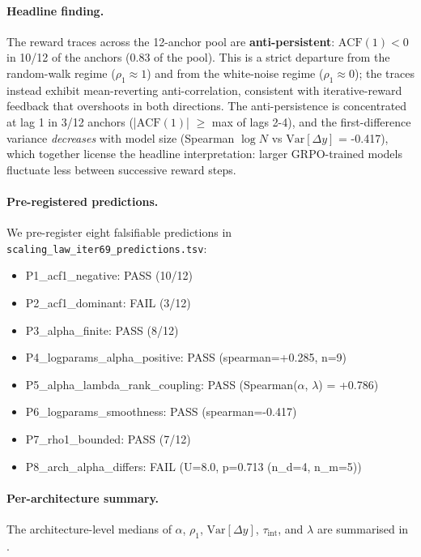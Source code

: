 \paragraph{Headline finding.}
The reward traces across the 12-anchor pool are
\textbf{anti-persistent}: $\mathrm{ACF}(1) < 0$ in
10/12 of the anchors (0.83 of the pool).
This is a strict departure from the random-walk regime
($\rho_1 \approx 1$) and from the white-noise regime
($\rho_1 \approx 0$); the traces instead exhibit mean-reverting
anti-correlation, consistent with iterative-reward feedback
that overshoots in both directions.  The anti-persistence is
concentrated at lag 1 in 3/12 anchors
(|$\mathrm{ACF}(1)$| $\geq$ max of lags 2-4), and the
first-difference variance \emph{decreases} with model size
(Spearman $\log N$ vs $\mathrm{Var}[\Delta y]$ = -0.417),
which together license the headline interpretation: larger
GRPO-trained models fluctuate less between successive reward
steps.

\paragraph{Pre-registered predictions.}
We pre-register eight falsifiable predictions in
\texttt{scaling_law_iter69_predictions.tsv}:
\begin{itemize}
  \item P1\_acf1\_negative: PASS (10/12)
  \item P2\_acf1\_dominant: FAIL (3/12)
  \item P3\_alpha\_finite: PASS (8/12)
  \item P4\_logparams\_alpha\_positive: PASS (spearman=+0.285, n=9)
  \item P5\_alpha\_lambda\_rank\_coupling: PASS (Spearman($\alpha$, $\lambda$) = +0.786)
  \item P6\_logparams\_smoothness: PASS (spearman=-0.417)
  \item P7\_rho1\_bounded: PASS (7/12)
  \item P8\_arch\_alpha\_differs: FAIL (U=8.0, p=0.713 (n\_d=4, n\_m=5))
\end{itemize}

\paragraph{Per-architecture summary.}
The architecture-level medians of $\alpha$, $\rho_1$,
$\mathrm{Var}[\Delta y]$, $\tau_\mathrm{int}$, and $\lambda$
are summarised in .

